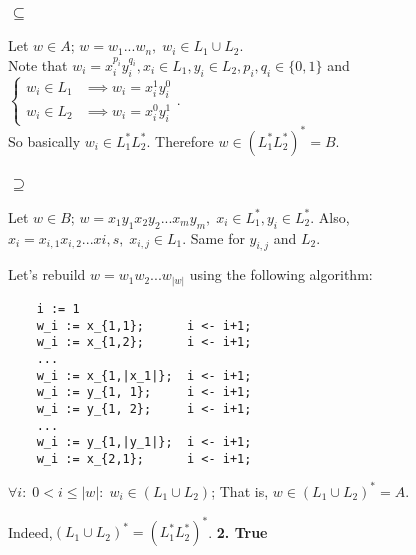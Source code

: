 \begin{minipage}{\linewidth}
    \subsubsection*{$\subseteq$}
    Let $w \in A$;
    $w = w_1 ... w_n,\; w_i \in L_1 \cup L_2$.\\
    Note that $w_i = x_i^{p_i}y_i^{q_i}, x_i\in L_1, y_i \in L_2, p_i,q_i \in \{0, 1\}$
    and $\begin{cases}
        w_i \in L_1 & \implies w_i = x_i^1 y_i^0 \\
        w_i \in L_2 & \implies w_i = x_i^0 y_i^1
    \end{cases}$.\\
    So basically $w_i \in L_1^* L_2^*$. Therefore $w \in (L_1^* L_2^*)^* = B$.
    
    \subsubsection*{$\supseteq$}
    Let $w \in B$;
    $w = x_1 y_1 x_2 y_2 ... x_m y_m,\; x_i \in L_1^*, y_i \in L_2^* $.
    Also, $x_i = x_{i,1} x_{i,2} ... x{i,s}, \; x_{i,j} \in L_1$. Same for $y_{i,j}$ and $L_2$.
    
    Let's rebuild $w = w_1 w_2 ... w_{|w|}$ using the following algorithm:
    \begin{lstlisting}
    i := 1
    w_i := x_{1,1};      i <- i+1; 
    w_i := x_{1,2};      i <- i+1; 
    ... 
    w_i := x_{1,|x_1|};  i <- i+1;
    w_i := y_{1, 1};     i <- i+1; 
    w_i := y_{1, 2};     i <- i+1; 
    ... 
    w_i := y_{1,|y_1|};  i <- i+1; 
    w_i := x_{2,1};      i <- i+1; \end{lstlisting}
    $\forall i :\; 0<i\le |w| :\; w_i \in (L_1 \cup L_2)$;
    That is, $w \in (L_1 \cup L_2)^* = A$. 
\end{minipage} 

Indeed,$(L_1 \cup L_2)^*  = (L_1^* L_2^*)^*$. \qedsymbol \quad \textbf{\large 2. True}

